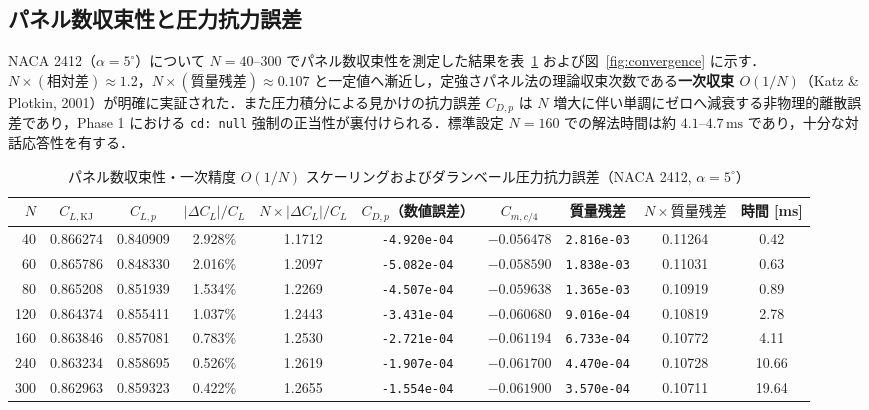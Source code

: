 \documentclass[10pt,a4paper]{article}
\begin{document}
\subsection{パネル数収束性と圧力抗力誤差}
NACA 2412（$\alpha=5^\circ$）について $N=40\text{--}300$ でパネル数収束性を測定した結果を表~\ref{tab:convergence} および図~\ref{fig:convergence} に示す．$N\times(\text{相対差}) \approx 1.2$，$N\times(\text{質量残差}) \approx 0.107$ と一定値へ漸近し，定強さパネル法の理論収束次数である\textbf{一次収束 $O(1/N)$}（Katz \& Plotkin, 2001）が明確に実証された．また圧力積分による見かけの抗力誤差 $C_{D,p}$ は $N$ 増大に伴い単調にゼロへ減衰する非物理的離散誤差であり，Phase 1 における \texttt{cd: null} 強制の正当性が裏付けられる．標準設定 $N=160$ での解法時間は約 $4.1\text{--}4.7\,\mathrm{ms}$ であり，十分な対話応答性を有する．

\begin{table}[H]
  \centering
  \caption{パネル数収束性・一次精度 $O(1/N)$ スケーリングおよびダランベール圧力抗力誤差（NACA 2412, $\alpha=5^\circ$）}
  \label{tab:convergence}
  \footnotesize
  \renewcommand{\arraystretch}{1.28}
  \setlength{\tabcolsep}{4.2pt}
  \begin{tabular}{@{}rccccccccc@{}}
    \toprule
    $N$ & $C_{L,\mathrm{KJ}}$ & $C_{L,p}$ & $|\Delta C_L|/C_L$ & $N\times|\Delta C_L|/C_L$ & $C_{D,p}$（数値誤差） & $C_{m,c/4}$ & 質量残差 & $N\times\text{質量残差}$ & 時間 [ms] \\
    \midrule
    40  & 0.866274 & 0.840909 & 2.928\% & 1.1712 & \texttt{-4.920e-04} & $-0.056478$ & \texttt{2.816e-03} & 0.11264 & 0.42 \\
    60  & 0.865786 & 0.848330 & 2.016\% & 1.2097 & \texttt{-5.082e-04} & $-0.058590$ & \texttt{1.838e-03} & 0.11031 & 0.63 \\
    80  & 0.865208 & 0.851939 & 1.534\% & 1.2269 & \texttt{-4.507e-04} & $-0.059638$ & \texttt{1.365e-03} & 0.10919 & 0.89 \\
    120 & 0.864374 & 0.855411 & 1.037\% & 1.2443 & \texttt{-3.431e-04} & $-0.060680$ & \texttt{9.016e-04} & 0.10819 & 2.78 \\
    160 & 0.863846 & 0.857081 & 0.783\% & 1.2530 & \texttt{-2.721e-04} & $-0.061194$ & \texttt{6.733e-04} & 0.10772 & 4.11 \\
    240 & 0.863234 & 0.858695 & 0.526\% & 1.2619 & \texttt{-1.907e-04} & $-0.061700$ & \texttt{4.470e-04} & 0.10728 & 10.66 \\
    300 & 0.862963 & 0.859323 & 0.422\% & 1.2655 & \texttt{-1.554e-04} & $-0.061900$ & \texttt{3.570e-04} & 0.10711 & 19.64 \\
    \bottomrule
  \end{tabular}
\end{table}
\end{document}
